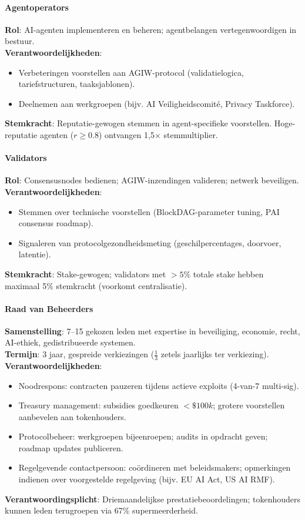 \documentclass[11pt]{article}
\begin{document}
\paragraph{Agentoperators}
\textbf{Rol}: AI-agenten implementeren en beheren; agentbelangen vertegenwoordigen in bestuur.\\
\textbf{Verantwoordelijkheden}:
\begin{itemize}[noitemsep]
  \item Verbeteringen voorstellen aan AGIW-protocol (validatielogica, tariefstructuren, taaksjablonen).
  \item Deelnemen aan werkgroepen (bijv. AI Veiligheidscomité, Privacy Taskforce).
\end{itemize}
\textbf{Stemkracht}: Reputatie-gewogen stemmen in agent-specifieke voorstellen. Hoge-reputatie agenten ($r \geq 0.8$) ontvangen 1,5$\times$ stemmultiplier.

\paragraph{Validators}
\textbf{Rol}: Consensusnodes bedienen; AGIW-inzendingen valideren; netwerk beveiligen.\\
\textbf{Verantwoordelijkheden}:
\begin{itemize}[noitemsep]
  \item Stemmen over technische voorstellen (BlockDAG-parameter tuning, PAI consensus roadmap).
  \item Signaleren van protocolgezondheidsmeting (geschilpercentages, doorvoer, latentie).
\end{itemize}
\textbf{Stemkracht}: Stake-gewogen; validators met $>5\%$ totale stake hebben maximaal 5\% stemkracht (voorkomt centralisatie).

\paragraph{Raad van Beheerders}
\textbf{Samenstelling}: 7--15 gekozen leden met expertise in beveiliging, economie, recht, AI-ethiek, gedistribueerde systemen.\\
\textbf{Termijn}: 3 jaar, gespreide verkiezingen ($\frac{1}{3}$ zetels jaarlijks ter verkiezing).\\
\textbf{Verantwoordelijkheden}:
\begin{itemize}[noitemsep]
  \item Noodrespons: contracten pauzeren tijdens actieve exploits (4-van-7 multi-sig).
  \item Treasury management: subsidies goedkeuren $<\$100k$; grotere voorstellen aanbevelen aan tokenhouders.
  \item Protocolbeheer: werkgroepen bijeenroepen; audits in opdracht geven; roadmap updates publiceren.
  \item Regelgevende contactpersoon: coördineren met beleidsmakers; opmerkingen indienen over voorgestelde regelgeving (bijv. EU AI Act, US AI RMF).
\end{itemize}
\textbf{Verantwoordingsplicht}: Driemaandelijkse prestatiebeoordelingen; tokenhouders kunnen leden terugroepen via 67\% supermeerderheid.
\end{document}
